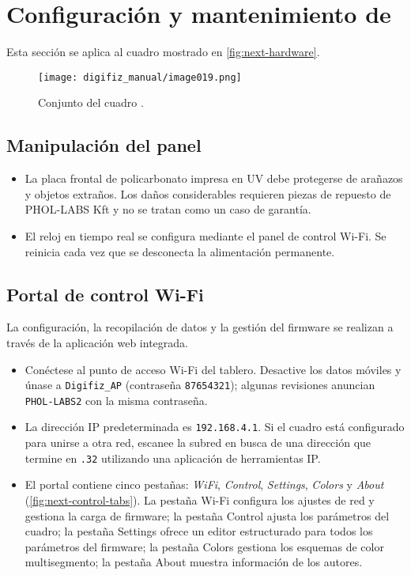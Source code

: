 \chapter{Configuración y mantenimiento de \ReplicaNextLong{}}\label{ch:replica-next-setup}

Esta sección se aplica al cuadro \ReplicaNextLong{} mostrado en \autoref{fig:next-hardware}.

\begin{figure}[htbp]
    \centering
    \texttt{[image: digifiz\_manual/image019.png]}
\caption{Conjunto del cuadro \ReplicaNextLong{}.}
    \label{fig:next-hardware}
\end{figure}

\section{Manipulación del panel}
\begin{itemize}
    \item La placa frontal de policarbonato impresa en UV debe protegerse de arañazos y objetos extraños. Los daños considerables requieren piezas de repuesto de PHOL-LABS Kft y no se tratan como un caso de garantía.
    \item El reloj en tiempo real se configura mediante el panel de control Wi-Fi. Se reinicia cada vez que se desconecta la alimentación permanente.
\end{itemize}

\section{Portal de control Wi-Fi}
La configuración, la recopilación de datos y la gestión del firmware se realizan a través de la aplicación web integrada.
\begin{itemize}
    \item Conéctese al punto de acceso Wi-Fi del tablero. Desactive los datos móviles y únase a \texttt{Digifiz\_AP} (contraseña \texttt{87654321}); algunas revisiones anuncian \texttt{PHOL-LABS2} con la misma contraseña.
    \item La dirección IP predeterminada es \texttt{192.168.4.1}. Si el cuadro está configurado para unirse a otra red, escanee la subred en busca de una dirección que termine en \texttt{.32} utilizando una aplicación de herramientas IP.
    \item El portal contiene cinco pestañas: \emph{WiFi}, \emph{Control}, \emph{Settings}, \emph{Colors} y \emph{About} (\autoref{fig:next-control-tabs}). La pestaña Wi-Fi configura los ajustes de red y gestiona la carga de firmware; la pestaña Control ajusta los parámetros del cuadro; la pestaña Settings ofrece un editor estructurado para todos los parámetros del firmware; la pestaña Colors gestiona los esquemas de color multisegmento; la pestaña About muestra información de los autores.
\end{itemize}

